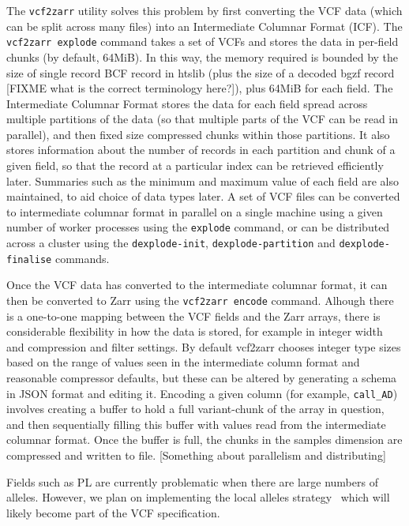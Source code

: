 \documentclass[a4paper,num-refs]{oup-contemporary}
\begin{document}
The \texttt{vcf2zarr} utility solves this problem by first converting 
the VCF data (which can be split across many files) into an Intermediate
Columnar Format (ICF). The \texttt{vcf2zarr explode} command takes a set
of VCFs and stores the data in per-field chunks (by default, 64MiB).
In this way, the memory required is bounded by the size of single record 
BCF record in htslib (plus the size of a decoded bgzf record
[FIXME what is the correct terminology here?]), plus 64MiB for each 
field.  The Intermediate Columnar Format stores the data for each 
field spread across multiple partitions of the data (so that 
multiple parts of the VCF can be read in parallel), and then 
fixed size compressed chunks within those partitions. It also stores information
about the number of records in each partition and chunk of a given
field, so that the record at a particular index can be retrieved efficiently 
later. Summaries such as the minimum and maximum value 
of each field are also maintained, to aid choice of data types later.
A set of VCF files can be converted to intermediate columnar 
format in parallel on a single machine using a given number 
of worker processes using the \texttt{explode} command,
or can be distributed across a cluster using the 
\texttt{dexplode-init},
\texttt{dexplode-partition} and \texttt{dexplode-finalise} commands.

Once the VCF data has converted to the intermediate columnar format,
it can then be converted to Zarr using the \texttt{vcf2zarr encode}
command. Alhough there is a one-to-one mapping between the VCF
fields and the Zarr arrays, there is considerable flexibility 
in how the data is stored, for example in integer width
and compression and filter settings.
By default vcf2zarr chooses integer type sizes based 
on the range of values seen in the intermediate column format
and reasonable compressor defaults, but these can be
altered by generating a schema in JSON format and editing it.
Encoding a given column (for example, \texttt{call\_AD})
involves creating a buffer to hold a full variant-chunk of the 
array in question, and then sequentially filling this buffer with 
values read from the intermediate columnar format. Once the buffer 
is full, the chunks in the samples dimension are compressed
and written to file. [Something about parallelism and distributing]

Fields such as PL are currently problematic when there are large 
numbers of alleles. However, we plan on implementing the 
local alleles strategy~\citep{poterba2024scalable,danecek2021twelve}
which will likely become part of the VCF specification.
\end{document}

